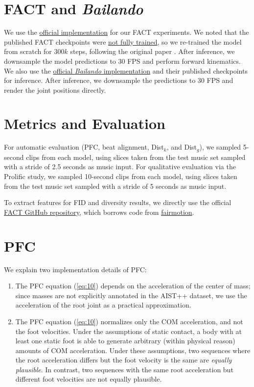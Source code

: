 \section{FACT and \textit{Bailando}}

We use the \href{https://github.com/google-research/mint/}{official implementation} for our FACT experiments.
We noted that the published FACT checkpoints were \href{https://github.com/google-research/mint/issues/42#issuecomment-1066211911}{not fully trained}, so we re-trained the model from scratch for $300k$ steps, following the original paper \cite{li2021ai}.
After inference, we downsample the model predictions to 30 FPS and perform forward kinematics.
We also use the \href{https://github.com/lisiyao21/Bailando}{official \textit{Bailando} implementation} and their published checkpoints for inference.
After inference, we downsample the predictions to 30 FPS and render the joint positions directly.

\section{Metrics and Evaluation}
\label{sec:appendix_metrics_and_eval}

For automatic evaluation (PFC, beat alignment, Dist$_k$, and Dist$_g$), we sampled 5-second clips from each model, using slices taken from the test music set sampled with a stride of 2.5 seconds as music input.
For qualitative evaluation via the Prolific study, we sampled 10-second clips from each model, using slices taken from the test music set sampled with a stride of 5 seconds as music input.

To extract features for FID and diversity results, we directly use the official
\href{https://github.com/google-research/mint}{FACT GitHub repository}, which borrows code from \href{https://github.com/facebookresearch/fairmotion}{fairmotion}.

\section{PFC}
\label{sec:appendix_pfc}

We explain two implementation details of PFC:
\begin{enumerate}
    \item The PFC equation (\cref{eq:10}) depends on the acceleration of the center of mass; since masses are not explicitly annotated in the AIST++ dataset, we use the acceleration of the root joint as a practical approximation.
    \item The PFC equation (\cref{eq:10}) normalizes only the COM acceleration, and not the foot velocities. Under the assumptions of static contact, a body with at least one static foot is able to generate arbitrary (within physical reason) amounts of COM acceleration. Under these assumptions, two sequences where the root acceleration differs but the foot velocity is the same are \textit{equally plausible}. In contrast, two sequences with the same root acceleration but different foot velocities are not equally plausible.
\end{enumerate}



